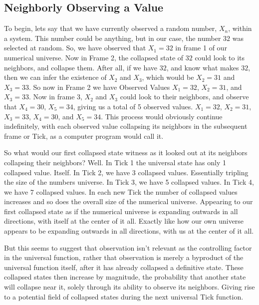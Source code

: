 \documentclass[11pt]{article}
\begin{document}
    \subsection{Neighborly Observing a Value}
        \hspace{1em}
        To begin, lets say that we have currently observed a random number, $X_n$, within a system.
        This number could be anything, but in our case, the number $32$ was selected at random.
        So, we have observed that $X_1 = 32$ in frame 1 of our numerical universe.
        Now in Frame 2, the collapsed state of $32$ could look to its neighbors, and collapse them.
        After all, if we have $32$, and know what makes $32$, then we can infer the existence of $X_2$ and $X_3$,
        which would be $X_2 = 31$ and $X_3 = 33$. So now in Frame 2 we have Observed Values $X_1 = 32$, $X_2 = 31$, and $X_3 = 33$.
        Now in frame 3, $X_2$ and $X_3$ could look to their neighbors, and observe that $X_4 = 30$, $X_5 = 34$, giving us a total of 5 observed values.
        $X_1 = 32$, $X_2 = 31$, $X_3 = 33$, $X_4 = 30$, and $X_5 = 34$. This process would obviously continue indefinitely, with each observed value collapsing its neighbors in the subsequent frame or Tick, as a computer program would call it.

        So what would our first collapsed state witness as it looked out at its neighbors collapsing their neighbors?
        Well. In Tick 1 the universal state has only 1 collapsed value. Itself.
        In Tick 2, we have 3 collapsed values.
        Essentially tripling the size of the numbers universe.
        In Tick 3, we have 5 collapsed values.
        In Tick 4, we have 7 collapsed values.
        In each new Tick the number of collapsed values increases and so does the overall size of the numerical universe.
        Appearing to our first collapsed state as if the numerical universe is expanding outwards in all directions, with itself at the center of it all.
        Exactly like how our own universe appears to be expanding outwards in all directions, with us at the center of it all.

        But this seems to suggest that observation isn't relevant as the controlling factor in the universal function,
        rather that observation is merely a byproduct of the universal function itself, after it has already collapsed a definitive state.
        These collapsed states then increase by magnitude, the probability that another state will collapse near it, solely through its ability to observe its neighbors.
        Giving rise to a potential field of collapsed states during the next universal Tick function.
\end{document}
